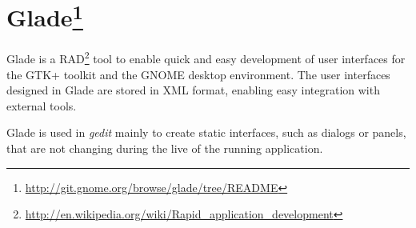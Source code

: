 
\section[Glade]{Glade\footnote{\url{http://git.gnome.org/browse/glade/tree/README}}}\label{Glade}

Glade is a RAD\footnote{\url{http://en.wikipedia.org/wiki/Rapid_application_development}} tool to enable quick and easy development of user interfaces for the GTK+ toolkit and the GNOME desktop environment. The user interfaces designed in Glade are stored in XML format, enabling easy integration with external tools.

Glade is used in \emph{gedit} mainly to create static interfaces, such as dialogs or panels, that are not changing during the live of the running application.

